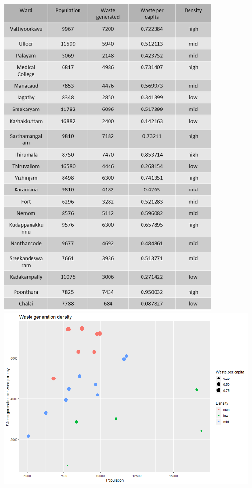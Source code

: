 \documentclass[12pt,a4paper]{  report}
\begin{document}
\begin{justify}
	\centering
	\includegraphics[width=0.85\textwidth]{table_waste_dens}
	\vspace{1cm}
	\hspace{5mm}
	\includegraphics[width=1\textwidth]{wgd}
	
\end{justify}
\end{document}
